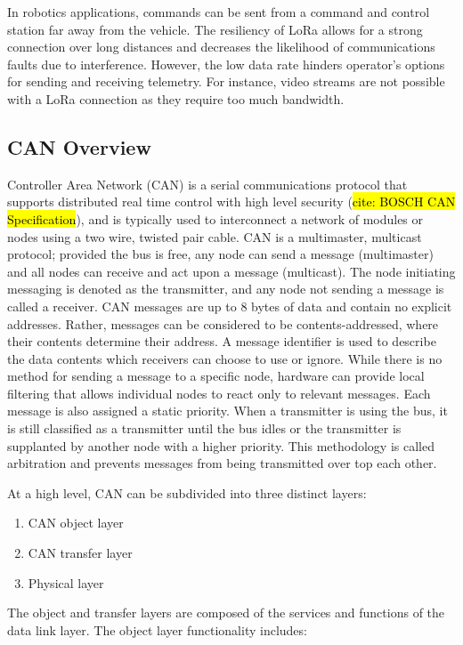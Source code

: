 In robotics applications, commands can be sent from a command and control station far away from the vehicle.
The resiliency of LoRa allows for a strong connection over long distances and decreases the likelihood of communications faults due to interference.
However, the low data rate hinders operator's options for sending and receiving telemetry.
For instance, video streams are not possible with a LoRa connection as they require too much bandwidth.

\subsection{CAN Overview}
Controller Area Network (CAN) is a serial communications protocol that supports distributed real time control with high level security (\hl{cite: BOSCH CAN Specification}), and is typically used to interconnect a network of modules or nodes using a two wire, twisted pair cable.
CAN is a multimaster, multicast protocol; provided the bus is free, any node can send a message (multimaster) and all nodes can receive and act upon a message (multicast). 
The node initiating messaging is denoted as the transmitter, and any node not sending a message is called a receiver. 
CAN messages are up to 8 bytes of data and contain no explicit addresses. 
Rather, messages can be considered to be contents-addressed, where their contents determine their address. 
A message identifier is used to describe the data contents which receivers can choose to use or ignore. 
While there is no method for sending a message to a specific node, hardware can provide local filtering that allows individual nodes to react only to relevant messages.
Each message is also assigned a static priority.
When a transmitter is using the bus, it is still classified as a transmitter until the bus idles or the transmitter is supplanted by another node with a higher priority.
This methodology is called arbitration and prevents messages from being transmitted over top each other.

At a high level, CAN can be subdivided into three distinct layers:

\begin{enumerate}
    \item CAN object layer
    \item CAN transfer layer
    \item Physical layer
\end{enumerate}

The object and transfer layers are composed of the services and functions of the data link layer. The object layer functionality includes:

